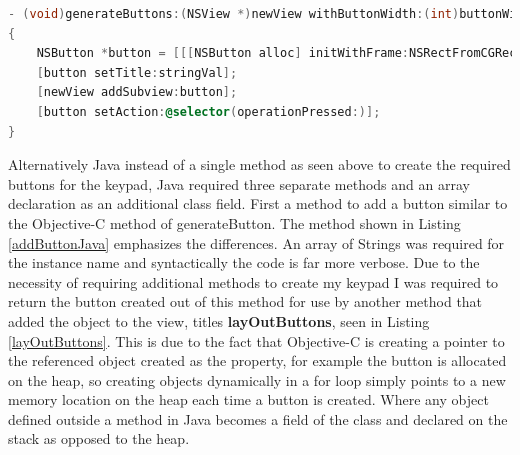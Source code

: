 \documentclass[a4paper,14pt]{article}
\begin{document}
\begin{lstlisting}[caption={Create Button - Objective-C},language=C,label=generateButtonObj,]
- (void)generateButtons:(NSView *)newView withButtonWidth:(int)buttonWidth andbuttonHeight:(int)buttonHeight andWhiteSpace:(int)whiteSpace withXPos:(int)xPos andYPos:(int)yPos withAdder:(int)adder andValue:(NSString *)stringVal
{
    NSButton *button = [[[NSButton alloc] initWithFrame:NSRectFromCGRect(CGRectMake(xPos, yPos , buttonWidth, buttonHeight)) ]autorelease];
    [button setTitle:stringVal];
    [newView addSubview:button];
    [button setAction:@selector(operationPressed:)];
}
\end{lstlisting}
Alternatively Java instead of a single method as seen above to create the required buttons for the keypad, Java required three separate methods and an array declaration as an additional class field.
First a method to add a button similar to the Objective-C method of generateButton. The method shown in Listing \ref{addButtonJava} emphasizes the differences. An array of Strings was required for the instance name and syntactically the code is far more verbose. Due to the necessity of requiring additional methods to create my keypad I was required to return the button created out of this method for use by another method that added the object to the view, titles \textbf{layOutButtons}, seen in Listing \ref{layOutButtons}.
This is due to the fact that Objective-C is creating a pointer to the referenced object created as the property, for example the button is allocated on the heap, so creating objects dynamically in a for loop simply points to a new memory location on the heap each time a button is created. Where any object defined outside a method in Java becomes a field of the class and declared on the stack as opposed to the heap.
\end{document}
